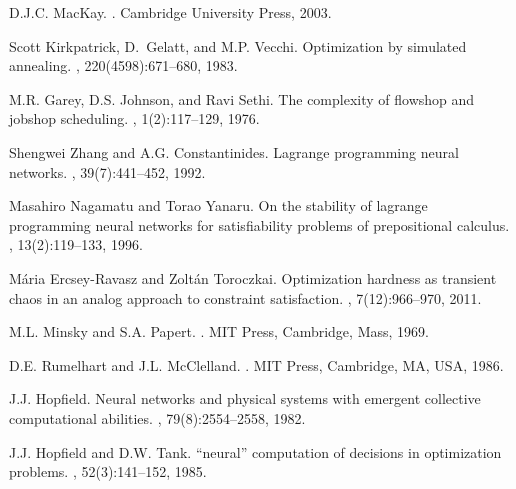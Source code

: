 \documentclass[10pt]{article}
\begin{document}

\begin{thebibliography}{10}

D.J.C. MacKay.
.
\newblock Cambridge University Press, 2003.

Scott Kirkpatrick, D.~Gelatt, and M.P. Vecchi.
\newblock Optimization by simulated annealing.
, 220(4598):671--680, 1983.

M.R. Garey, D.S. Johnson, and Ravi Sethi.
\newblock The complexity of flowshop and jobshop scheduling.
, 1(2):117--129, 1976.

Shengwei Zhang and A.G. Constantinides.
\newblock Lagrange programming neural networks.
, 39(7):441--452, 1992.

Masahiro Nagamatu and Torao Yanaru.
\newblock On the stability of lagrange programming neural networks for
  satisfiability problems of prepositional calculus.
, 13(2):119--133, 1996.

M{\'a}ria Ercsey-Ravasz and Zolt{\'a}n Toroczkai.
\newblock Optimization hardness as transient chaos in an analog approach to
  constraint satisfaction.
, 7(12):966--970, 2011.

M.L. Minsky and S.A. Papert.
.
\newblock MIT Press, Cambridge, Mass, 1969.

D.E. Rumelhart and J.L. McClelland.
.
\newblock MIT Press, Cambridge, MA, USA, 1986.

J.J. Hopfield.
\newblock Neural networks and physical systems with emergent collective
  computational abilities.
,
  79(8):2554--2558, 1982.

J.J. Hopfield and D.W. Tank.
\newblock “neural” computation of decisions in optimization problems.
, 52(3):141--152, 1985.


\end{thebibliography}
\end{document}
